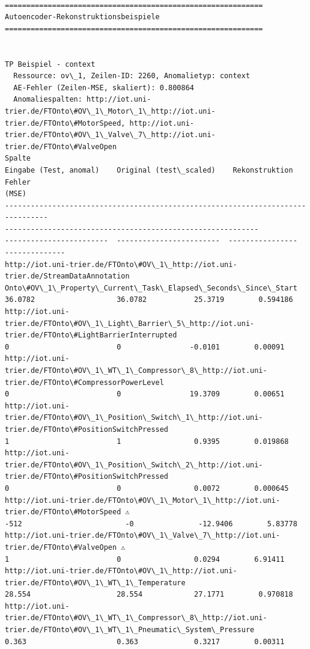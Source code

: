 \documentclass[11pt]{article}
\begin{document}
    \begin{Verbatim}[commandchars=\\\{\}]

============================================================
Autoencoder-Rekonstruktionsbeispiele
============================================================


TP Beispiel - context
  Ressource: ov\_1, Zeilen-ID: 2260, Anomalietyp: context
  AE-Fehler (Zeilen-MSE, skaliert): 0.800864
  Anomaliespalten: http://iot.uni-trier.de/FTOnto\#OV\_1\_Motor\_1\_http://iot.uni-
trier.de/FTOnto\#MotorSpeed, http://iot.uni-
trier.de/FTOnto\#OV\_1\_Valve\_7\_http://iot.uni-trier.de/FTOnto\#ValveOpen
Spalte
Eingabe (Test, anomal)    Original (test\_scaled)    Rekonstruktion    Fehler
(MSE)
--------------------------------------------------------------------------------
-----------------------------------------------------------
------------------------  ------------------------  ----------------
--------------
http://iot.uni-trier.de/FTOnto\#OV\_1\_http://iot.uni-trier.de/StreamDataAnnotation
Onto\#OV\_1\_Property\_Current\_Task\_Elapsed\_Seconds\_Since\_Start
36.0782                   36.0782           25.3719        0.594186
http://iot.uni-trier.de/FTOnto\#OV\_1\_Light\_Barrier\_5\_http://iot.uni-
trier.de/FTOnto\#LightBarrierInterrupted
0                         0                -0.0101        0.00091
http://iot.uni-trier.de/FTOnto\#OV\_1\_WT\_1\_Compressor\_8\_http://iot.uni-
trier.de/FTOnto\#CompressorPowerLevel
0                         0                19.3709        0.00651
http://iot.uni-trier.de/FTOnto\#OV\_1\_Position\_Switch\_1\_http://iot.uni-
trier.de/FTOnto\#PositionSwitchPressed
1                         1                 0.9395        0.019868
http://iot.uni-trier.de/FTOnto\#OV\_1\_Position\_Switch\_2\_http://iot.uni-
trier.de/FTOnto\#PositionSwitchPressed
0                         0                 0.0072        0.000645
http://iot.uni-trier.de/FTOnto\#OV\_1\_Motor\_1\_http://iot.uni-
trier.de/FTOnto\#MotorSpeed ⚠
-512                        -0               -12.9406        5.83778
http://iot.uni-trier.de/FTOnto\#OV\_1\_Valve\_7\_http://iot.uni-
trier.de/FTOnto\#ValveOpen ⚠
1                         0                 0.0294        6.91411
http://iot.uni-trier.de/FTOnto\#OV\_1\_http://iot.uni-
trier.de/FTOnto\#OV\_1\_WT\_1\_Temperature
28.554                    28.554            27.1771        0.970818
http://iot.uni-trier.de/FTOnto\#OV\_1\_WT\_1\_Compressor\_8\_http://iot.uni-
trier.de/FTOnto\#OV\_1\_WT\_1\_Pneumatic\_System\_Pressure
0.363                     0.363             0.3217        0.00311

\end{Verbatim}
\end{document}
